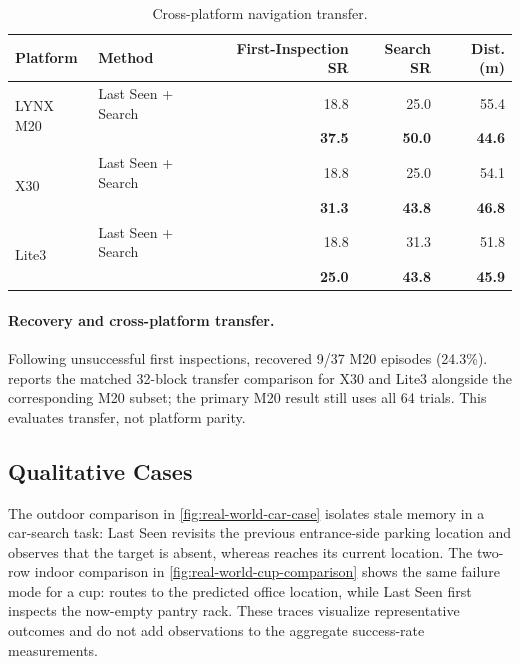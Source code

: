 \par\medskip
{}
\begin{table}
\vspace{-0.7\baselineskip}
\centering
\caption{Cross-platform navigation transfer.}
\label{tab:real-transfer}
\scriptsize
\setlength{\tabcolsep}{2.5pt}
\begin{tabular}{@{}llrrr@{}}
\toprule
\textbf{Platform} & \textbf{Method} & \textbf{First-Inspection SR} &
\textbf{Search SR} & \textbf{Dist. (m)} \\
\midrule
\multirow{2}{*}{LYNX M20} & Last Seen + Search & 18.8 & 25.0 & 55.4 \\
& \textbf{\evolvingworldnav{}} & \textbf{37.5} & \textbf{50.0} & \textbf{44.6} \\
\midrule
\multirow{2}{*}{X30} & Last Seen + Search & 18.8 & 25.0 & 54.1 \\
& \textbf{\evolvingworldnav{}} & \textbf{31.3} & \textbf{43.8} & \textbf{46.8} \\
\midrule
\multirow{2}{*}{Lite3} & Last Seen + Search & 18.8 & 31.3 & 51.8 \\
& \textbf{\evolvingworldnav{}} & \textbf{25.0} & \textbf{43.8} & \textbf{45.9} \\
\bottomrule
\end{tabular}
\end{table}

\paragraph{Recovery and cross-platform transfer.}
Following unsuccessful first inspections, \evolvingworldnav{} recovered 9/37 M20
episodes (24.3\%).  reports the matched 32-block
transfer comparison for X30 and Lite3 alongside the corresponding M20 subset;
the primary M20 result still uses all 64 trials. This evaluates transfer, not
platform parity.

\subsection{Qualitative Cases}
\label{app:real-world-cases}

The outdoor comparison in \cref{fig:real-world-car-case} isolates stale memory
in a car-search task: Last Seen revisits the previous entrance-side parking
location and observes that the target is absent, whereas \evolvingworldnav{}
reaches its current location. The two-row indoor comparison in
\cref{fig:real-world-cup-comparison} shows the same failure mode for a cup:
\evolvingworldnav{} routes to the predicted office location, while Last Seen
first inspects the now-empty pantry rack. These traces visualize representative
outcomes and do not add observations to the aggregate success-rate measurements.

